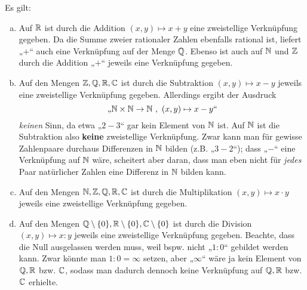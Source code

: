 \begin{bsp}[Grundrechenarten]
Es gilt:
 \begin{enumerate}[a)]
 \item Auf ${\mathbb R}$ ist durch die Addition $(x,y)\mapsto x+y$ eine zweistellige Verknüpfung gegeben. Da die Summe zweier rationaler Zahlen ebenfalls rational ist, liefert „$+$“ auch eine Verknüpfung auf der Menge ${\mathbb Q}$. Ebenso ist auch auf ${\mathbb N}$ und ${\mathbb Z}$ durch die Addition „$+$“ jeweils eine Verknüpfung gegeben.
  \item Auf den Mengen ${\mathbb Z},{\mathbb Q},{\mathbb R},{\mathbb C}$ ist durch die Subtraktion $(x,y)\mapsto x-y$ jeweils eine zweistellige Verknüpfung gegeben. Allerdings ergibt der Ausdruck
  \[ \text{„$\Nz \times \Nz \to \Nz \ ,\ (x,y) \mapsto x-y$“} \]
  \emph{keinen} Sinn, da etwa „$2-3$“ gar kein Element von ${\mathbb N}$ ist. Auf ${\mathbb N}$ ist die Subtraktion also \textbf{keine} zweistellige Verknüpfung. Zwar kann man für gewisse Zahlenpaare durchaus Differenzen in ${\mathbb N}$ bilden (z.B. „$3-2$“); dass „$-$“ eine Verknüpfung auf ${\mathbb N}$ wäre, scheitert aber daran, dass man eben nicht für \emph{jedes} Paar natürlicher Zahlen eine Differenz in ${\mathbb N}$ bilden kann.
  \item Auf den Mengen ${\mathbb N},{\mathbb Z},{\mathbb Q},{\mathbb R},{\mathbb C}$ ist durch die Multiplikation $(x,y)\mapsto x\cdot y$ jeweils eine zweistellige Verknüpfung gegeben.
  \item Auf den Mengen ${\mathbb Q}\setminus \{0\},{\mathbb R}\setminus \{0\},{\mathbb C}\setminus \{0\}$ ist durch die Division $(x,y)\mapsto x:y$ jeweils eine zweistellige Verknüpfung gegeben. Beachte, dass die Null ausgelassen werden muss, weil bspw. nicht „$1:0$“ gebildet werden kann. Zwar könnte man $1:0=\infty$ setzen, aber „$\infty$“ wäre ja kein Element von ${\mathbb Q},{\mathbb R}$ bzw. ${\mathbb C}$, sodass man dadurch dennoch keine Verknüpfung auf ${\mathbb Q},{\mathbb R}$ bzw. ${\mathbb C}$ erhielte.
 \end{enumerate}
\end{bsp}





